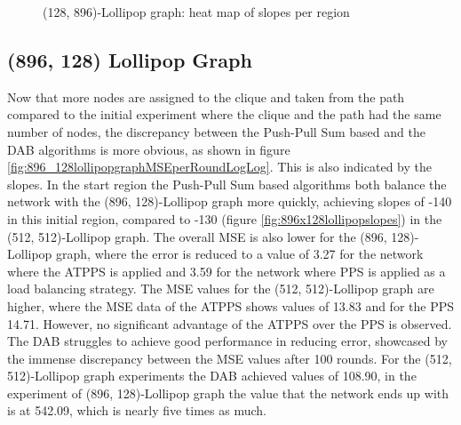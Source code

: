 \begin{figure}
    \centering
    \caption{(128, 896)-Lollipop graph: heat map of slopes per region}
    \label{fig:128_896lollipopslopes}
\end{figure}

\subsection{(896, 128) Lollipop Graph}\label{subsec:896_128lollipop}
Now that more nodes are assigned to the clique and taken from the path compared to the initial experiment where the clique and the path had the same number of nodes, the discrepancy between the Push-Pull Sum based and the DAB algorithms is more obvious, as shown in figure \ref{fig:896_128lollipopgraphMSEperRoundLogLog}. This is also indicated by the slopes. In the start region the Push-Pull Sum based algorithms both balance the network with the (896, 128)-Lollipop graph more quickly, achieving slopes of -140 in this initial region, compared to -130 (figure \ref{fig:896x128lollipopslopes}) in the (512, 512)-Lollipop graph. The overall MSE is also lower for the (896, 128)-Lollipop graph, where the error is reduced to a value of 3.27 for the network where the ATPPS is applied and 3.59 for the network where PPS is applied as a load balancing strategy. The MSE values for the (512, 512)-Lollipop graph are higher, where the MSE data of the ATPPS shows values of 13.83 and for the PPS 14.71. However, no significant advantage of the ATPPS over the PPS is observed. The DAB struggles to achieve good performance in reducing error, showcased by the immense discrepancy between the MSE values after 100 rounds. For the (512, 512)-Lollipop graph experiments the DAB achieved values of 108.90, in the experiment of (896, 128)-Lollipop graph the value that the network ends up with is at 542.09, which is nearly five times as much.

